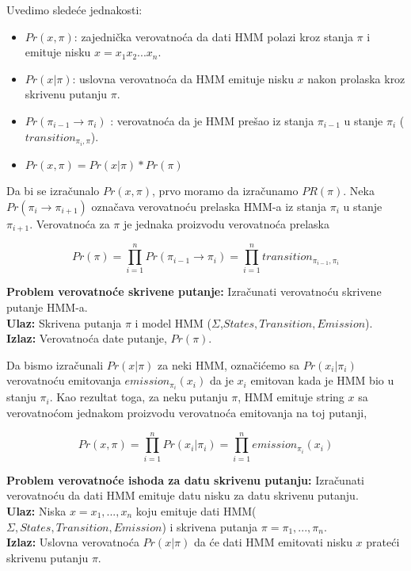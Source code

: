 Uvedimo sledeće jednakosti:

\begin{itemize}
    \item $ Pr(x, \pi) $: zajednička verovatnoća da dati HMM
    polazi kroz stanja $ \pi $ i emituje nisku $ x = x_1 x_2
    . . . x_n $.
    \item $ Pr(x|\pi) $: uslovna verovatnoća da HMM
    emituje nisku $ x $ nakon prolaska kroz skrivenu putanju $ \pi $.
    \item $Pr(\pi_{i-1} \rightarrow \pi_i)$ : verovatnoća da je HMM prešao  iz stanja $\pi_{i-1}$ u stanje $\pi_i$ ($transition_{\pi_i, \pi}$).
    \item $ Pr(x, \pi) = Pr(x|\pi) * Pr(\pi) $
\end{itemize}

Da bi se izračunalo $ Pr(x, \pi) $, prvo moramo da izračunamo $ PR(\pi) $. Neka $ Pr(\pi_i \rightarrow \pi_{i+1}) $ označava verovatnoću prelaska HMM-a iz stanja $ \pi_i $ u stanje $ \pi_{i+1} $. Verovatnoća za $ \pi $ je jednaka proizvodu verovatnoća prelaska 

\begin{equation}
    Pr(\pi) = {\displaystyle \prod_{i=1}^n Pr(\pi_{i-1} \rightarrow \pi_i)} = {\displaystyle \prod_{i=1}^n transition_{\pi_{i-1}, \pi_i}}
\end{equation}

\begin{tcolorbox}\textbf{Problem verovatnoće skrivene putanje:}
	Izračunati verovatnoću skrivene putanje HMM-a.\\
	\textbf{Ulaz:} Skrivena putanja $ \pi $ i model HMM ($ \Sigma $,$ States,Transition,Emission $). \\
	\textbf{Izlaz:} Verovatnoća date putanje, $ Pr(\pi) $.
\end{tcolorbox}

Da bismo izračunali $ Pr(x|\pi) $ za neki HMM, označićemo sa $ Pr(x_i|\pi_i) $ verovatnoću emitovanja $ emission_{\pi_i}(x_i) $ da je $ x_i $ emitovan kada je HMM bio u stanju $ \pi_i $. Kao rezultat toga, za neku putanju $ \pi $, HMM emituje string $ x $ sa verovatnoćom jednakom proizvodu verovatnoća emitovanja na toj putanji,

\begin{equation}
    Pr(x, \pi) = {\displaystyle \prod_{i=1}^n Pr(x_i|\pi_i)} = {\displaystyle \prod_{i=1}^n emission_{\pi_i}(x_i)}    
\end{equation}

\begin{tcolorbox}\textbf{Problem verovatnoće ishoda za datu skrivenu putanju:}
	Izračunati verovatnoću da dati HMM emituje datu nisku za datu skrivenu putanju.\\
	\textbf{Ulaz:}  Niska $ x=x_1, ..., x_n $ koju emituje dati HMM($ \Sigma, States, Transition, Emission $) i skrivena putanja $ \pi = \pi_1, ..., \pi_n. $\\
	\textbf{Izlaz:}  Uslovna verovatnoća $ Pr(x|\pi) $ da će dati HMM emitovati nisku $ x $ prateći skrivenu putanju $ \pi $.
\end{tcolorbox}

